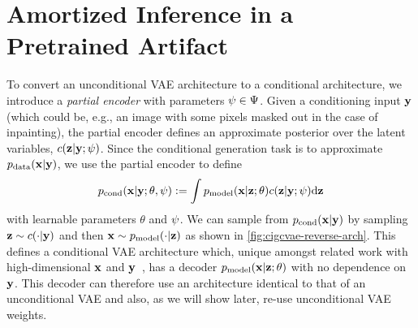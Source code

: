 \section{Amortized Inference in a Pretrained Artifact}
To convert an unconditional VAE architecture to a conditional architecture, we
introduce a \textit{partial encoder} with parameters $\psi{}\in\Psi{}$.
%
%
Given a conditioning input $\mathbf{y}{}$ (which could be, e.g., an image with some
pixels masked out in the case of inpainting), the partial encoder defines an
approximate posterior over the latent variables,
$c{}(\mathbf{z}{}|\mathbf{y}{}; \psi)$.
%
Since the conditional generation task is
to approximate $p_{\rm{data}}{}(\mathbf{x}{}|\mathbf{y}{})$, we use the partial encoder to define
\begin{equation}
  \label{eq:marginal-image-posterior}
  p_{\text{cond}}{}(\mathbf{x}{}|\mathbf{y}{}; \theta, \psi) := \int p_{\rm{model}}{}(\mathbf{x}{}|\mathbf{z}{}; \theta)c{}(\mathbf{z}{}|\mathbf{y}{}; \psi) \mathrm{d}\mathbf{z}{}
\end{equation}
with learnable parameters $\theta$ and $\psi$. We can sample from
$p_{\text{cond}}{}(\mathbf{x}{}|\mathbf{y}{})$ by sampling $\mathbf{z}{}\sim c{}(\cdot|\mathbf{y}{})$ and then
$\mathbf{x}{}\sim p_{\rm{model}}{}(\cdot|\mathbf{z}{})$ as shown in \cref{fig:cigcvae-reverse-arch}. This defines
a conditional VAE architecture which, unique amongst related work with
high-dimensional $\mathbf{x}{}$ and
$\mathbf{y}{}$~\citep{sohn2015learning,zheng2019pluralistic,ivanov2018variational,wan2021high},
has a decoder $p_{\rm{model}}{}(\mathbf{x}{}|\mathbf{z}{}; \theta)$ with no dependence on $\mathbf{y}{}$. This
decoder can therefore use an architecture identical to that of an unconditional
VAE and also, as we will show later, re-use unconditional VAE weights.

